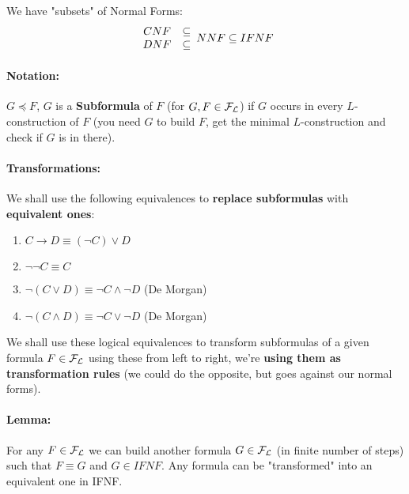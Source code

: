 \documentclass[11pt]{article}
\begin{document}
	
	We have "subsets" of Normal Forms: 
	$$ 
	\begin{array}{c c}
		CNF & \subseteq \\
		DNF & \subseteq
	\end{array}
	NNF \subseteq IFNF
	$$
	
	\newpage
	
	
	\paragraph{Notation:} $G \preceq F$, $G$ is a \textbf{Subformula} of $F$ (for $G,F \in \mathcal{F}_\mathcal{L}$) if $G$ occurs in every $L$-construction of $F$ (you need $G$ to build $F$, get the minimal $L$-construction and check if $G$ is in there).\\
	
	\paragraph{Transformations:} We shall use the following equivalences to \textbf{replace subformulas} with \textbf{equivalent ones}:
	\begin{enumerate}
		\item $C \rightarrow D \equiv (\neg C) \vee D$
		\item $\neg \neg C \equiv C$
		\item $\neg (C \vee D) \equiv \neg C \wedge \neg D$ (De Morgan)
		\item $\neg (C \wedge D) \equiv \neg C \vee \neg D$ (De Morgan)
	\end{enumerate}
	
	We shall use these logical equivalences to transform subformulas of a given formula $F \in \mathcal{F}_\mathcal{L}$ using these from left to right, we're \textbf{using them as transformation rules} (we could do the opposite, but goes against our normal forms).\\
	
	\paragraph{Lemma:} For any $F \in \mathcal{F}_\mathcal{L}$ we can build another formula $G \in \mathcal{F}_\mathcal{L}$ (in finite number of steps) such that $F \equiv G$ and $G \in IFNF$. Any formula can be "transformed" into an equivalent one in IFNF.\\
	
\end{document}
